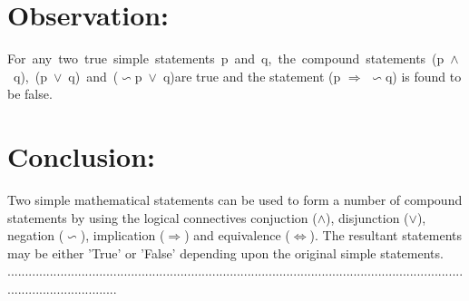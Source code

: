 \documentclass[11pt]{article}
\begin{document}
\section{Observation:}
\mbox{For any two true simple statements p and q, the compound statements (p $\wedge$ q), (p $\vee$ q) and ($\backsim$p $\vee$ q)}are true and the statement (p $\Rightarrow$ $\backsim$q) is found to be false.
    
\section{Conclusion:}
Two simple mathematical statements can be used to form a number of compound statements by using the logical connectives conjuction ($\wedge$), disjunction ($\vee$), negation ($\backsim$), implication ($\Rightarrow$) and equivalence ($\Leftrightarrow$). The resultant statements may be either 'True' or 'False' depending upon the original simple statements.\\[7cm]
\hspace{-1cm}
................................................................................................................................................................




\end{document}
